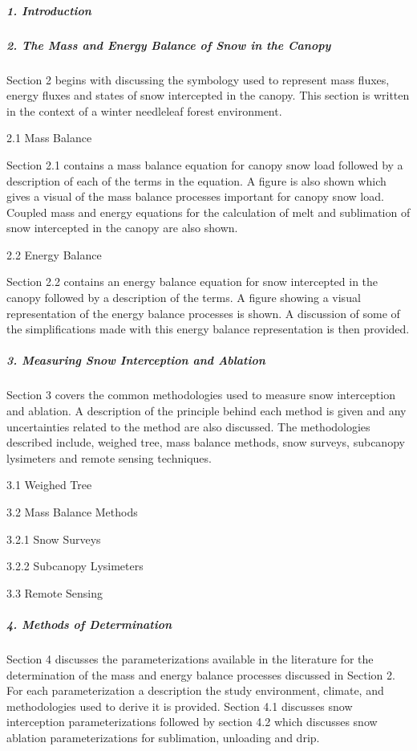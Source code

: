\documentclass[
  letterpaper,
  DIV=11,
  numbers=noendperiod]{scrartcl}
\let\oldsubparagraph\subparagraph
\renewcommand{\subparagraph}[1]{\oldsubparagraph{#1}\mbox{}}
\begin{document}
\subparagraph{1. Introduction}\label{introduction-1}

\subparagraph{2. The Mass and Energy Balance of Snow in the
Canopy}\label{the-mass-and-energy-balance-of-snow-in-the-canopy}

Section 2 begins with discussing the symbology used to represent mass
fluxes, energy fluxes and states of snow intercepted in the canopy. This
section is written in the context of a winter needleleaf forest
environment.

2.1 Mass Balance

Section 2.1 contains a mass balance equation for canopy snow load
followed by a description of each of the terms in the equation. A figure
is also shown which gives a visual of the mass balance processes
important for canopy snow load. Coupled mass and energy equations for
the calculation of melt and sublimation of snow intercepted in the
canopy are also shown.

2.2 Energy Balance

Section 2.2 contains an energy balance equation for snow intercepted in
the canopy followed by a description of the terms. A figure showing a
visual representation of the energy balance processes is shown. A
discussion of some of the simplifications made with this energy balance
representation is then provided.

\subparagraph{3. Measuring Snow Interception and
Ablation}\label{measuring-snow-interception-and-ablation}

Section 3 covers the common methodologies used to measure snow
interception and ablation. A description of the principle behind each
method is given and any uncertainties related to the method are also
discussed. The methodologies described include, weighed tree, mass
balance methods, snow surveys, subcanopy lysimeters and remote sensing
techniques.

3.1 Weighed Tree

3.2 Mass Balance Methods

3.2.1 Snow Surveys

3.2.2 Subcanopy Lysimeters

3.3 Remote Sensing

\subparagraph{4. Methods of
Determination}\label{methods-of-determination}

Section 4 discusses the parameterizations available in the literature
for the determination of the mass and energy balance processes discussed
in Section 2. For each parameterization a description the study
environment, climate, and methodologies used to derive it is provided.
Section 4.1 discusses snow interception parameterizations followed by
section 4.2 which discusses snow ablation parameterizations for
sublimation, unloading and drip.
\end{document}
